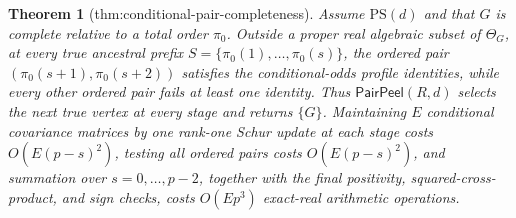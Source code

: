 \documentclass{article}
\newtheorem{theorem}{Theorem}
\begin{document}
\begin{theorem}[thm:conditional-pair-completeness]\label{thm:conditional-pair-completeness}
Assume \(\mathrm{PS}(d)\) and that \(G\) is complete relative to a total order \(\pi_0\). Outside a proper real algebraic subset of \(\Theta_G\), at every true ancestral prefix \(S=\{\pi_0(1),\ldots,\pi_0(s)\}\), the ordered pair \((\pi_0(s+1),\pi_0(s+2))\) satisfies the conditional-odds profile identities, while every other ordered pair fails at least one identity. Thus \(\mathsf{PairPeel}(R,d)\) selects the next true vertex at every stage and returns \(\{G\}\). Maintaining \(E\) conditional covariance matrices by one rank-one Schur update at each stage costs \(O(E(p-s)^2)\), testing all ordered pairs costs \(O(E(p-s)^2)\), and summation over \(s=0,\ldots,p-2\), together with the final positivity, squared-cross-product, and sign checks, costs \(O(Ep^3)\) exact-real arithmetic operations.
\end{theorem}
\end{document}
